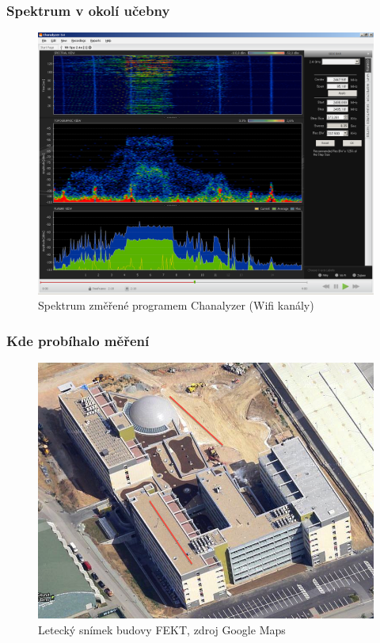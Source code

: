 \documentclass{beamer}
\begin{document}
	\begin{frame}
	\frametitle{Spektrum v okolí učebny}
	\begin{figure}[!ht]
	\centering%
	\includegraphics[scale=0.2, keepaspectratio]{spektrum2}%
	\caption{Spektrum změřené programem Chanalyzer (Wifi kanály)}
	\end{figure}
	\end{frame}

	\begin{frame}
	\frametitle{Kde probíhalo měření}
	\begin{figure}[!ht]
	\centering%
	\includegraphics[scale=0.3, keepaspectratio]{mapa}%
	\caption{Letecký snímek budovy FEKT, zdroj Google Maps}
	\end{figure}
	\end{frame}
\end{document}
